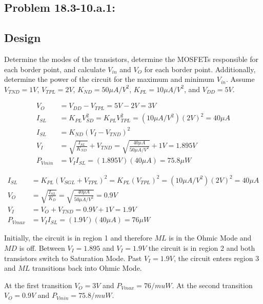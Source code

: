 \documentclass[12pt,letterpaper,titlepage]{article}
\begin{document}
\begin{raggedright}
\begin{paracol}{2}
\section{Problem 18.3-10.a.1: } 
\subsection{Design}
Determine the modes of the transistors, determine the MOSFETs responsible for each border point, and calculate $V_{in}$ and $V_O$ for each border point. Additionally, determine the power of the circuit for the maximum and minimum $V_{in}$. Assume $V_{TND} = 1V$, $V_{TPL} = 2V$, $K_{ND} = 50\mu A/V^2$, $K_{PL} = 10\mu A/V^2$, and $V_{DD} = 5V$.

\begin{align*}
   V_O
   &= V_{DD} - V_{TPL}
    = 5V - 2V
    = 3V
\\ I_{SL}
   &= K_{PL} V_{SD}^2
    = K_{PL} V_{TPL}^2
    = (10\mu A/V^2)(2V)^2
    = 40\mu A
\\ I_{SL}
   &= K_{ND} (V_I - V_{TND})^2
\\ V_I
   &= \sqrt{\frac{I_{SL}}{K_{ND}}} + V_{TND}
    = \sqrt{\frac{40\mu A}{50\mu A/V^2}} + 1V
    = 1.895V
\\ P_{Vmin}
   &= V_II_{SL}
    = (1.895V)(40\mu A)
    = 75.8\mu W
\end{align*}
\end{paracol}

\begin{align*}
   I_{SL}
   &= K_{PL} (V_{SGL} + V_{TPL})^2
    = K_{PL} (V_{TPL})^2
    = (10\mu A/V^2)(2V)^2
    = 40\mu A
\\ V_O
   &= \sqrt{\frac{I_{SL}}{K_{D}}}
    = \sqrt{\frac{40\mu A}{50\mu A/V^2}}
    = 0.9V
\\ V_I
   &= V_O + V_{TND}
    = 0.9V + 1V
    = 1.9V
\\ P_{Vmax}
   &= V_II_{SL}
    = (1.9V)(40\mu A)
    = 76\mu W
\end{align*}

Initially, the circuit is in region 1 and therefore $ML$ is in the Ohmic Mode and $MD$ is off. Between $V_I = 1.895$ and $V_I = 1.9V$ the circuit is in region 2 and both transistors switch to Saturation Mode. Past $V_I = 1.9V$, the circuit enters region 3 and $ML$ transitions back into Ohmic Mode.

At the first transition $V_O = 3V$ and $P_{Vmax} = 76/mu W$. At the second transition  $V_O = 0.9V$ and $P_{Vmin} = 75.8/mu W$.

\clearpage

\end{raggedright}
\end{document}
